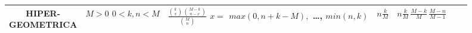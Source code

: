 \documentclass[12pt,a4paper]{report}
\begin{document}
\begin{landscape}
\begin{tabular}{|c|c|c|c|c|c|c|}
\hline 
\parbox[c][2\height][c]{1.2in}{HIPER-\\GEOMETRICA} & \parbox[c][2\height][c]{1.2in}{ $ M>0 $\\$ 0<k,n<M $} & \parbox[c][2\height][c]{1.3in}{$ \frac{\displaystyle \binom{k}{x}\,\binom{M-k}{n-x} }{\displaystyle\binom{M}{n}}$ \\ $ x= $\\$max\left(0,n+k-M\right),$\\ \dots, $min\left(n,k\right)$} & $ \displaystyle n\frac{k}{M} $ & $ \displaystyle n\frac{k}{M}\,\frac{M-k}{M}\,\frac{M-n}{M-1} $ & $  $ & $  $\\
\hline 
\end{tabular} 
\end{landscape}

\end{document}
